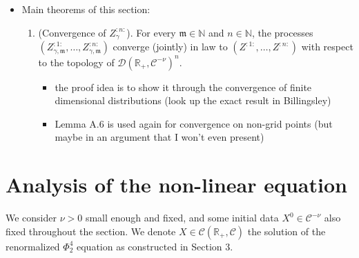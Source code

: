 \documentclass{report}
\theoremstyle{remark}
\theoremstyle{definition}
\begin{document}
\begin{itemize}
  \item Main theorems of this section:
  \begin{enumerate}
    \item (Convergence of $Z_\gamma^{:n:}$). For every $\mathfrak{m} \in \mathbb{N}$ and $n \in \mathbb{N}$, the processes $(Z_{\gamma, \mathfrak{m}}^{:1:}, \ldots, Z_{\gamma, \mathfrak{m}}^{:n:})$ converge (jointly) in law to $(Z^{:1:}, \ldots, Z^{:n:})$ with respect to the topology of $\mathcal{D}(\mathbb{R}_+, \mathcal{C}^{-\nu})^n$.
    \begin{itemize}
      \item the proof idea is to show it through the convergence of finite dimensional distributions (look up the exact result in Billingsley)
      \item Lemma A.6 is used again for convergence on non-grid points (but maybe in an argument that I won't even present)
    \end{itemize}
  \end{enumerate}
\end{itemize}
\chapter{Analysis of the non-linear equation}
We consider $\nu > 0$ small enough and fixed, and some initial data $X^0 \in \mathcal{C}^{-\nu}$ also fixed throughout the section. We denote $X \in \mathcal{C}(\mathbb{R}_+, \mathcal{C})$ the solution of the renormalized $\Phi^4_2$ equation as constructed in Section 3.
\end{document}
